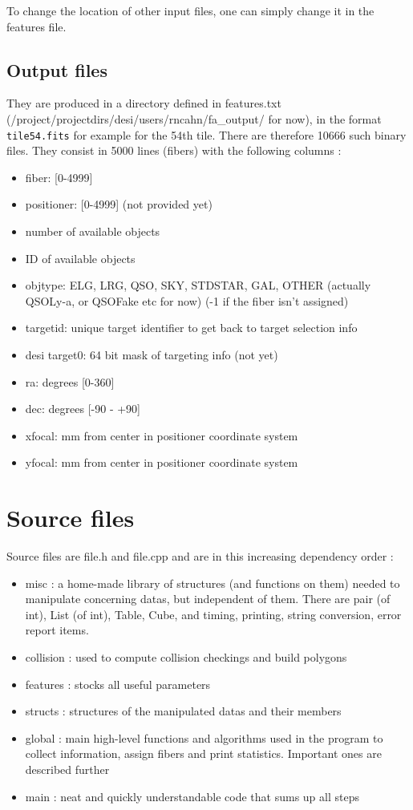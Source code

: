 \documentclass{extarticle}
\begin{document}
To change the location of other input files, one can simply change it in the features file.

\subsection{Output files}
They are produced in a directory defined in features.txt (/project/projectdirs/desi/users/rncahn/fa\_output/ for now), in the format {\tt tile54.fits} for example for the 54th tile. There are therefore 10666 such binary files. They consist in 5000 lines (fibers) with the following columns :

\begin{itemize} 
    \item fiber: [0-4999]
    \item positioner: [0-4999] (not provided yet)
    \item number of available objects
    \item ID of available objects
    \item objtype: ELG, LRG, QSO, SKY, STDSTAR, GAL, OTHER (actually QSOLy-a, or QSOFake etc for now) (-1 if the fiber isn't assigned)
    \item targetid: unique target identifier to get back to target selection info
    \item desi target0: 64 bit mask of targeting info (not yet)
    \item ra: degrees [0-360]
    \item dec: degrees [-90 - +90]
    \item xfocal: mm from center in positioner coordinate system
    \item yfocal: mm from center in positioner coordinate system 
\end{itemize} 

\section{Source files}
Source files are file.h and file.cpp and are in this increasing dependency order :
\begin{itemize} 
	\item misc : a home-made library of structures (and functions on them) needed to manipulate concerning datas, but independent of them. There are pair (of int), List (of int), Table, Cube, and timing, printing, string conversion, error report items.
	\item collision : used to compute collision checkings and build polygons
	\item features : stocks all useful parameters
	\item structs : structures of the manipulated datas and their members
	\item global : main high-level functions and algorithms used in the program to collect information, assign fibers and print statistics. Important ones are described further
	\item main : neat and quickly understandable code that sums up all steps
\end{itemize} 
\end{document}

